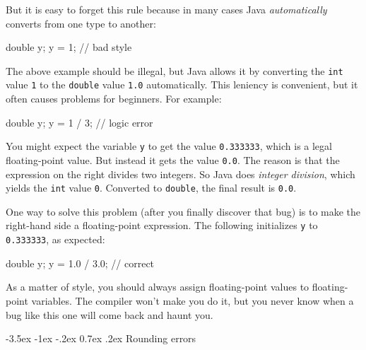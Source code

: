 \documentclass[12pt]{book}
\makeatletter
\theoremstyle{exercise}
\newcommand{\java}[1]{\verb"#1"}
\renewcommand{\section}{\@startsection {section}{1}{\z@}%
    {-3.5ex \@plus -1ex \@minus -.2ex}%
    {0.7ex \@plus.2ex}%
    {\normalfont\Large\bfseries}}
\newcommand{\java}[1]{\lstinline{#1}} %
\makeatother
\begin{document}
But it is easy to forget this rule because in many cases Java {\em automatically} converts from one type to another:

\begin{code}
    double y;
    y = 1;  // bad style
\end{code}

The above example should be illegal, but Java allows it by converting the \java{int} value \java{1} to the \java{double} value \java{1.0} automatically.
This leniency is convenient, but it often causes problems for beginners. For example:

\begin{code}
    double y;
    y = 1 / 3;  // logic error
\end{code}


You might expect the variable \java{y} to get the value \java{0.333333}, which is a legal floating-point value.
But instead it gets the value \java{0.0}.
The reason is that the expression on the right divides two integers.
So Java does {\em integer division}, which yields the \java{int} value \java{0}.
Converted to \java{double}, the final result is \java{0.0}.

One way to solve this problem (after you finally discover that bug) is to make the right-hand side a floating-point expression.
The following initializes \java{y} to \java{0.333333}, as expected:

\begin{code}
    double y;
    y = 1.0 / 3.0;  // correct
\end{code}

As a matter of style, you should always assign floating-point values to floating-point variables.
The compiler won't make you do it, but you never know when a bug like this one will come back and haunt you.


\section{Rounding errors}


\end{document}
